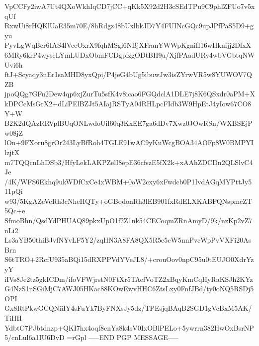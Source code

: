 VpCCFy2iwA7Ut4QXoWkhIqCD7jCC+qKk5X92d2H3cSEdTPu9C9phlZFUo7v5xqUf
RxwUi8rHQKlUaE35m70E/8hRdgz48bUxlbkJD7Y4FUINcGQc9upJPfPaS5D9+gyu
PyvLgWqBcr6IAS4lVceOxrX9fqhMSgi6NBjXFranYWWpKgnifI16wHknijj2DfxX
6MRy6krP4wyseLYmLUDxObmFCDgpfzgODtBH9u/XjfPAadURy4wbVGbtqNWUvi6h
ftJ+Scyaqy3nEr1saMHD8yxQpi/P4jeG4bUg5ibuwJw3isZYrwVR5w8YUWOV7QZB
jpoQQg7GFu2Dew4qp6xjZurTu5sfK4v8icao6FGQdclA1DLE7j8K6QSxdr0aPM+X
kDPCcMsGrX2+dLiPElBZJt5AIajRSTyA04RHLpcFIdb3W9HpEtJ4yIow67CO8Y+W
B2K2dQAzRRVplBUqONLwdoUil60q3KxEE7ga6dDv7Xwz0JOwRSn/WXBSEjPw08jZ
lOn+9FXoru8grOr243LyBfRoh4TGLE91wAC9yKuWcgBOA34AOFp8W0BMPYIlzjtX
m7TQQcnLhDSb3/HfyLekLAKPZelI8epE36cfszE5fX2k+xAAhZDCDn2QLSlvC4Je
/4K/WFS6Ekhq9ukWDfCxCe4xWBM+0oW2cxy6xFwdcb0P1IvdAGqMYPttJy511pQi
w93/5KgAZeVeRh3cNheHQTy+oGBqdonRh3lEB901fxRdELXKABFQNspmcZT5Qc+e
SfmoBhn/QsdYdPHUAQ89pkxUpO1f2Z1nk54CECoqmZRnAmyD/9k/nzKp2vZ7nLi2
Ls3aYB50thiBJvfNYvLF5Y2/zqHN3A8FA8QX5R5e5cW5nnPvcWpPvVXFi20AsBrn
S6tTRO+2RcfU935aBQi15dRXPPVdYVeJL8/+crouOov0npC95u0tEUJO0XdrYzyY
iIVs8Je2tz5gkICDm/ifoVFWjrstN0FtXr5TAefVoTZ2xBqyKmCqHyRaKSJh2KYz
G4NzS1nSGiMjC7AWJ05HKac88KOwEwvHHC6ZtsLxy0FnfJBd/ty0oNQ5RSDj5OPI
Gx8RtPkwGCQNiiIY4sFuYk7ByFNXsJy5dz/TPEsjqBAqB2SGD1gVcBxM5AK/TiHH
YdbtC7PJbtdnzp+QKI7hx4oqf8cnYa8k4sV0IxOBlPELo+5ywrrn382HwOxBsrNP
5/cnLul6a1IU6DvD
=rGpl
-----END PGP MESSAGE-----
